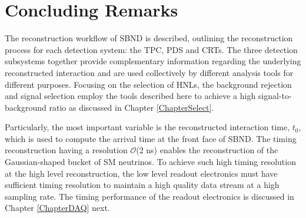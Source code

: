 \section{Concluding Remarks}
\label{sec:reco_concluding_remarks}

The reconstruction workflow of SBND is described, outlining the reconstruction process for each detection system: the TPC, PDS and CRTs.
The three detection subsystems together provide complementary information regarding the underlying reconstructed interaction and are used collectively by different analysis tools for different purposes.
Focusing on the selection of HNLs, the background rejection and signal selection employ the tools described here to achieve a high signal-to-background ratio as discussed in Chapter \ref{ChapterSelect}.

Particularly, the most important variable is the reconstructed interaction time, $t_0$, which is used to compute the arrival time at the front face of SBND.
The timing reconstruction having a resolution $\mathcal{O}$(2 ns) enables the reconstruction of the Gaussian-shaped bucket of SM neutrinos.
To achieve such high timing resolution at the high level reconstruction, the low level readout electronics must have sufficient timing resolution to maintain a high quality data stream at a high sampling rate.
The timing performance of the readout electronics is discussed in Chapter \ref{ChapterDAQ} next.

